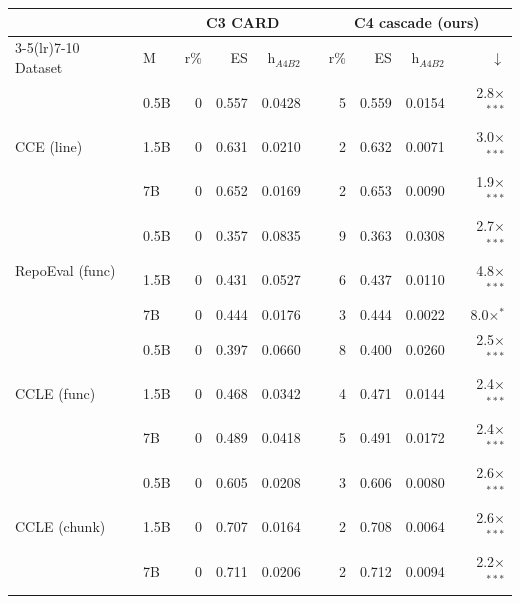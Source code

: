 \begin{tabular}{ll rrr r rrr r}
\toprule
 & & \multicolumn{3}{c}{\textbf{C3 CARD}} & & \multicolumn{4}{c}{\textbf{C4 cascade (ours)}}\\
\cmidrule(lr){3-5}\cmidrule(lr){7-10}
Dataset & M & r\% & ES & h$_{A4B2}$ & & r\% & ES & h$_{A4B2}$ & $\downarrow$\\
\midrule
\multirow{3}{*}{CCE (line)} & 0.5B & 0 & 0.557 & 0.0428 & & 5 & 0.559 & 0.0154 & 2.8$\times$$^{***}$\\
 & 1.5B & 0 & 0.631 & 0.0210 & & 2 & 0.632 & 0.0071 & 3.0$\times$$^{***}$\\
 & 7B & 0 & 0.652 & 0.0169 & & 2 & 0.653 & 0.0090 & 1.9$\times$$^{***}$\\
\midrule
\multirow{3}{*}{RepoEval (func)} & 0.5B & 0 & 0.357 & 0.0835 & & 9 & 0.363 & 0.0308 & 2.7$\times$$^{***}$\\
 & 1.5B & 0 & 0.431 & 0.0527 & & 6 & 0.437 & 0.0110 & 4.8$\times$$^{***}$\\
 & 7B & 0 & 0.444 & 0.0176 & & 3 & 0.444 & 0.0022 & 8.0$\times$$^{*}$\\
\midrule
\multirow{3}{*}{CCLE (func)} & 0.5B & 0 & 0.397 & 0.0660 & & 8 & 0.400 & 0.0260 & 2.5$\times$$^{***}$\\
 & 1.5B & 0 & 0.468 & 0.0342 & & 4 & 0.471 & 0.0144 & 2.4$\times$$^{***}$\\
 & 7B & 0 & 0.489 & 0.0418 & & 5 & 0.491 & 0.0172 & 2.4$\times$$^{***}$\\
\midrule
\multirow{3}{*}{CCLE (chunk)} & 0.5B & 0 & 0.605 & 0.0208 & & 3 & 0.606 & 0.0080 & 2.6$\times$$^{***}$\\
 & 1.5B & 0 & 0.707 & 0.0164 & & 2 & 0.708 & 0.0064 & 2.6$\times$$^{***}$\\
 & 7B & 0 & 0.711 & 0.0206 & & 2 & 0.712 & 0.0094 & 2.2$\times$$^{***}$\\
\bottomrule
\end{tabular}